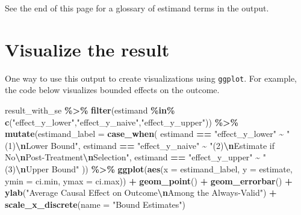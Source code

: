 \documentclass[
]{book}
\newenvironment{Shaded}{\begin{snugshade}}{\end{snugshade}}
\newcommand{\AttributeTok}[1]{\textcolor[rgb]{0.13,0.29,0.53}{#1}}
\newcommand{\FunctionTok}[1]{\textcolor[rgb]{0.13,0.29,0.53}{\textbf{#1}}}
\newcommand{\NormalTok}[1]{#1}
\newcommand{\SpecialCharTok}[1]{\textcolor[rgb]{0.81,0.36,0.00}{\textbf{#1}}}
\newcommand{\StringTok}[1]{\textcolor[rgb]{0.31,0.60,0.02}{#1}}
\begin{document}
See the end of this page for a glossary of estimand terms in the output.

\hypertarget{visualize-the-result}{%
\section{Visualize the result}\label{visualize-the-result}}

One way to use this output to create visualizations using \texttt{ggplot}. For example, the code below visualizes bounded effects on the outcome.

\begin{Shaded}
\begin{Highlighting}[]
\NormalTok{result\_with\_se }\SpecialCharTok{\%\textgreater{}\%}
  \FunctionTok{filter}\NormalTok{(estimand }\SpecialCharTok{\%in\%} \FunctionTok{c}\NormalTok{(}\StringTok{"effect\_y\_lower"}\NormalTok{,}\StringTok{"effect\_y\_naive"}\NormalTok{,}\StringTok{"effect\_y\_upper"}\NormalTok{)) }\SpecialCharTok{\%\textgreater{}\%}
  \FunctionTok{mutate}\NormalTok{(}\AttributeTok{estimand\_label =} \FunctionTok{case\_when}\NormalTok{(}
\NormalTok{    estimand }\SpecialCharTok{==} \StringTok{"effect\_y\_lower"} \SpecialCharTok{\textasciitilde{}} \StringTok{"(1)}\SpecialCharTok{\textbackslash{}n}\StringTok{Lower Bound"}\NormalTok{,}
\NormalTok{    estimand }\SpecialCharTok{==} \StringTok{"effect\_y\_naive"} \SpecialCharTok{\textasciitilde{}} \StringTok{"(2)}\SpecialCharTok{\textbackslash{}n}\StringTok{Estimate if No}\SpecialCharTok{\textbackslash{}n}\StringTok{Post{-}Treatment}\SpecialCharTok{\textbackslash{}n}\StringTok{Selection"}\NormalTok{,}
\NormalTok{    estimand }\SpecialCharTok{==} \StringTok{"effect\_y\_upper"} \SpecialCharTok{\textasciitilde{}} \StringTok{"(3)}\SpecialCharTok{\textbackslash{}n}\StringTok{Upper Bound"}
\NormalTok{  )) }\SpecialCharTok{\%\textgreater{}\%}
  \FunctionTok{ggplot}\NormalTok{(}\FunctionTok{aes}\NormalTok{(}\AttributeTok{x =}\NormalTok{ estimand\_label, }\AttributeTok{y =}\NormalTok{ estimate,}
             \AttributeTok{ymin =}\NormalTok{ ci.min, }\AttributeTok{ymax =}\NormalTok{ ci.max)) }\SpecialCharTok{+}
  \FunctionTok{geom\_point}\NormalTok{() }\SpecialCharTok{+}
  \FunctionTok{geom\_errorbar}\NormalTok{() }\SpecialCharTok{+}
  \FunctionTok{ylab}\NormalTok{(}\StringTok{"Average Causal Effect on Outcome}\SpecialCharTok{\textbackslash{}n}\StringTok{Among the Always{-}Valid"}\NormalTok{) }\SpecialCharTok{+}
  \FunctionTok{scale\_x\_discrete}\NormalTok{(}\AttributeTok{name =} \StringTok{"Bound Estimates"}\NormalTok{)}
\end{Highlighting}
\end{Shaded}
\end{document}
